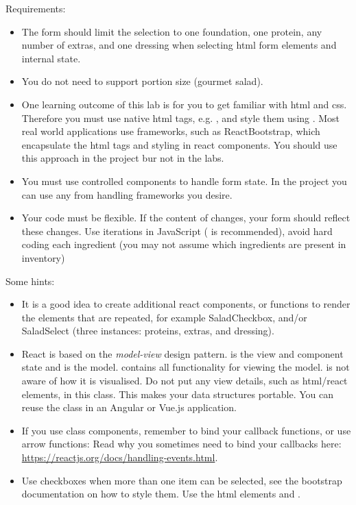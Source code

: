 \documentclass[fleqn, article, a4paper]{memoir}
\begin{document}
\begin{Assignments}
\noindent Requirements:
\begin{itemize}
  \item The form should limit the selection to one foundation, one protein, any number of extras, and one dressing when selecting html form elements and internal state.
  \item You do not need to support portion size (gourmet salad).
  \item One learning outcome of this lab is for you to get familiar with html and css. Therefore you must use native html tags, e.g. , and style them using . Most real world applications use frameworks, such as ReactBootstrap, which encapsulate the html tags and styling in react components. You should use this approach in the project bur not in the labs.
  \item You must use controlled components to handle form state. In the project you can use any from handling frameworks you desire.
  \item Your code must be flexible. If the content of  changes, your form should reflect these changes. Use iterations in JavaScript ( is recommended), avoid hard coding each ingredient (you may not assume which ingredients are present in inventory)
\end{itemize}
\noindent Some hints:
\begin{itemize}
  \item It is a good idea to create additional react components, or functions to render the elements that are repeated, for example SaladCheckbox, and/or SaladSelect (three instances: proteins, extras, and dressing).
  \item React is based on the \emph{model-view} design pattern.  is the view and component state and  is the model.  contains all functionality for viewing the model.  is not aware of how it is visualised. Do not put any view details, such as html/react elements, in this class. This makes your data structures portable. You can reuse the  class in an Angular or Vue.js application.
  \item If you use class components, remember to bind your callback functions, or use arrow functions:  Read why you sometimes need to bind your callbacks here:\\ \url{https://reactjs.org/docs/handling-events.html}.
  \item Use checkboxes when more than one item can be selected, see the bootstrap documentation on how to style them. Use the html elements  and .

\end{itemize}
\end{Assignments}
\end{document}
